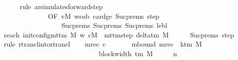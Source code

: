 \begin{isabellebody}
\ \ \ \ \isamarkupfalse%
\ {\isacharparenleft}{\kern0pt}rule\ ar{\isacharunderscore}{\kern0pt}simulates{\isacharunderscore}{\kern0pt}forward{\isacharunderscore}{\kern0pt}step\isanewline
\ \ \ \ \ \ \ \ \ \ \ \ \ \ {\isacharbrackleft}{\kern0pt}OF\ vM\ w{\isacharunderscore}{\kern0pt}sub\ card{\isacharunderscore}{\kern0pt}ge\ Suc{\isachardot}{\kern0pt}prems{\isacharparenleft}{\kern0pt}{}{\isacharparenright}{\kern0pt}\ step{}\isanewline
\ \ \ \ \ \ \ \ \ \ \ \ \ \ \ \ \ \ Suc{\isachardot}{\kern0pt}prems{\isacharparenleft}{\kern0pt}{}{\isacharparenright}{\kern0pt}\ Suc{\isachardot}{\kern0pt}prems{\isacharparenleft}{\kern0pt}{}{\isacharparenright}{\kern0pt}\ Suc{\isachardot}{\kern0pt}prems{\isacharparenleft}{\kern0pt}{}{\isacharparenright}{\kern0pt}\ lebl{\isacharbrackright}{\kern0pt}{\isacharparenright}{\kern0pt}\isanewline
\ \ \isamarkupfalse%
\ reach{}{\isacharcolon}{\kern0pt}\ {\isachardoublequoteopen}{\isacharparenleft}{\kern0pt}init{\isacharunderscore}{\kern0pt}config{\isacharunderscore}{\kern0pt}mttm\ M\ w{\isacharcomma}{\kern0pt}\ cM{\isacharunderscore}{\kern0pt}{}{\isacharparenright}{\kern0pt}\ {\isasymin}\ {\isacharparenleft}{\kern0pt}mttm{\isacharunderscore}{\kern0pt}step\ {\isacharparenleft}{\kern0pt}delta{\isacharunderscore}{\kern0pt}tm\ M{\isacharparenright}{\kern0pt}{\isacharparenright}{\kern0pt}\isactrlsup {\isacharasterisk}{\kern0pt}{\isachardoublequoteclose}\isanewline
\ \ \ \ \isamarkupfalse%
\ Suc{\isachardot}{\kern0pt}prems{\isacharparenleft}{\kern0pt}{}{\isacharparenright}{\kern0pt}\ step{}\ \isamarkupfalse%
\ {\isacharparenleft}{\kern0pt}rule\ rtrancl{\isacharunderscore}{\kern0pt}into{\isacharunderscore}{\kern0pt}rtrancl{\isacharparenright}{\kern0pt}\isanewline
\ \ \isamarkupfalse%
\ m{\isacharunderscore}{\kern0pt}rec\ c{\isacharprime}{\kern0pt}{\isacharprime}{\kern0pt}\ \isanewline
\ \ \ \ \ \ mbound{\isacharcolon}{\kern0pt}\ {\isachardoublequoteopen}m{\isacharunderscore}{\kern0pt}rec\ {\isasymle}\ {\isacharparenleft}{\kern0pt}k{\isacharunderscore}{\kern0pt}tm\ M\isanewline
\ \ \ \ \ \ \ \ \ \ \ \ \ \ \ \ \ \ \ \ \ \ \ \ \ \ {\isacharasterisk}{\kern0pt}\ {\isacharparenleft}{\kern0pt}{}\ {\isacharasterisk}{\kern0pt}\ block{\isacharunderscore}{\kern0pt}width\ {\isacharparenleft}{\kern0pt}{\isasymGamma}{\isacharunderscore}{\kern0pt}tm\ M{\isacharparenright}{\kern0pt}\ {\isacharplus}{\kern0pt}\ {}{\isacharparenright}{\kern0pt}\ {\isacharplus}{\kern0pt}\ {}{\isacharparenright}{\kern0pt}\ {\isacharasterisk}{\kern0pt}\ n{\isacharprime}{\kern0pt}{\isachardoublequoteclose}\isanewline

\end{isabellebody}
